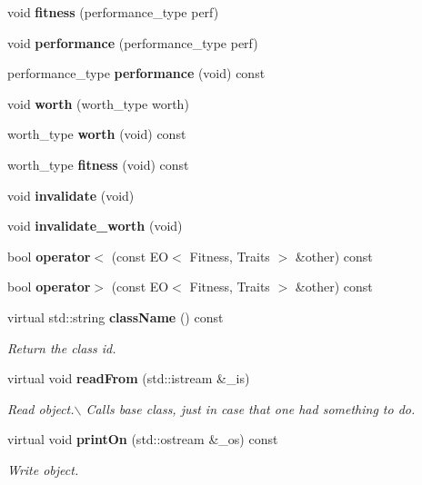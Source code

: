 \begin{CompactItemize}
\item 
void {\bf fitness} (performance\_\-type perf)\label{class_e_o_a9}

\item 
void {\bf performance} (performance\_\-type perf)\label{class_e_o_a10}

\item 
performance\_\-type {\bf performance} (void) const \label{class_e_o_a11}

\item 
void {\bf worth} (worth\_\-type worth)\label{class_e_o_a12}

\item 
worth\_\-type {\bf worth} (void) const \label{class_e_o_a13}

\item 
worth\_\-type {\bf fitness} (void) const \label{class_e_o_a14}

\item 
void {\bf invalidate} (void)\label{class_e_o_a15}

\item 
void {\bf invalidate\_\-worth} (void)\label{class_e_o_a16}

\item 
bool {\bf operator$<$} (const EO$<$ Fitness, Traits $>$ \&other) const \label{class_e_o_a17}

\item 
bool {\bf operator$>$} (const EO$<$ Fitness, Traits $>$ \&other) const \label{class_e_o_a18}

\end{CompactItemize}
{\bf }\par
\begin{CompactItemize}
\item 
virtual std::string {\bf class\-Name} () const 
\begin{CompactList}\small\item\em Return the class id. \item\end{CompactList}\item 
virtual void {\bf read\-From} (std::istream \&\_\-is)
\begin{CompactList}\small\item\em Read object.$\backslash$ Calls base class, just in case that one had something to do. \item\end{CompactList}\item 
virtual void {\bf print\-On} (std::ostream \&\_\-os) const 
\begin{CompactList}\small\item\em Write object. \item\end{CompactList}\end{CompactItemize}


